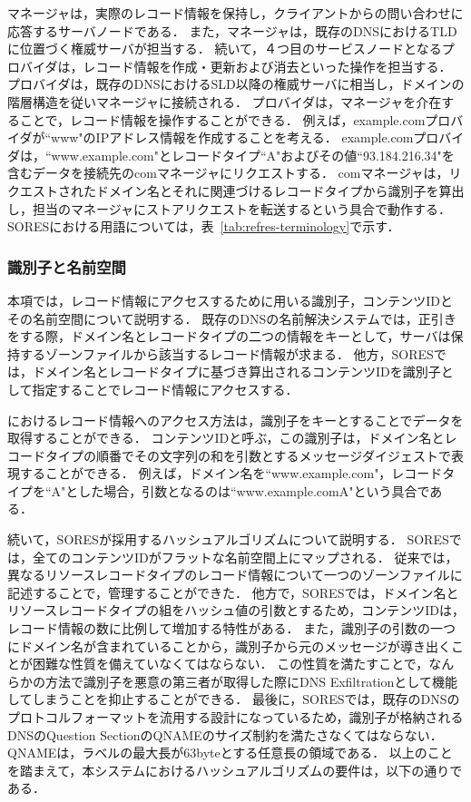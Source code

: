 マネージャは，実際のレコード情報を保持し，クライアントからの問い合わせに応答するサーバノードである．
また，マネージャは，既存のDNSにおけるTLDに位置づく権威サーバが担当する．
続いて，４つ目のサービスノードとなるプロバイダは，レコード情報を作成・更新および消去といった操作を担当する．
プロバイダは，既存のDNSにおけるSLD以降の権威サーバに相当し，ドメインの階層構造を従いマネージャに接続される．
プロバイダは，マネージャを介在することで，レコード情報を操作することができる．
例えば，example.comプロバイダが``www"のIPアドレス情報を作成することを考える．
example.comプロバイダは，``www.example.com"とレコードタイプ``A"およびその値``93.184.216.34"を含むデータを接続先のcomマネージャにリクエストする．
comマネージャは，リクエストされたドメイン名とそれに関連づけるレコードタイプから識別子を算出し，担当のマネージャにストアリクエストを転送するという具合で動作する．
SORESにおける用語については，表~\ref{tab:refres-terminology}で示す．


\subsubsection{識別子と名前空間}
本項では，レコード情報にアクセスするために用いる識別子，コンテンツIDとその名前空間について説明する．
既存のDNSの名前解決システムでは，正引きをする際，ドメイン名とレコードタイプの二つの情報をキーとして，サーバは保持するゾーンファイルから該当するレコード情報が求まる．
他方，SORESでは，ドメイン名とレコードタイプに基づき算出されるコンテンツIDを識別子として指定することでレコード情報にアクセスする．

におけるレコード情報へのアクセス方法は，識別子をキーとすることでデータを取得することができる．
コンテンツIDと呼ぶ，この識別子は，ドメイン名とレコードタイプの順番でその文字列の和を引数とするメッセージダイジェストで表現することができる．
例えば，ドメイン名を``www.example.com"，レコードタイプを``A"とした場合，引数となるのは``www.example.comA"という具合である．

続いて，SORESが採用するハッシュアルゴリズムについて説明する．
SORESでは，全てのコンテンツIDがフラットな名前空間上にマップされる．
従来では，異なるリソースレコードタイプのレコード情報について一つのゾーンファイルに記述することで，管理することができた．
他方で，SORESでは，ドメイン名とリソースレコードタイプの組をハッシュ値の引数とするため，コンテンツIDは，レコード情報の数に比例して増加する特性がある．
また，識別子の引数の一つにドメイン名が含まれていることから，識別子から元のメッセージが導き出くことが困難な性質を備えていなくてはならない．
この性質を満たすことで，なんらかの方法で識別子を悪意の第三者が取得した際にDNS Exfiltrationとして機能してしまうことを抑止することができる．
最後に，SORESでは，既存のDNSのプロトコルフォーマットを流用する設計になっているため，識別子が格納されるDNSのQuestion SectionのQNAMEのサイズ制約を満たさなくてはならない．
QNAMEは，ラベルの最大長が63byteとする任意長の領域である．
以上のことを踏まえて，本システムにおけるハッシュアルゴリズムの要件は，以下の通りである．

